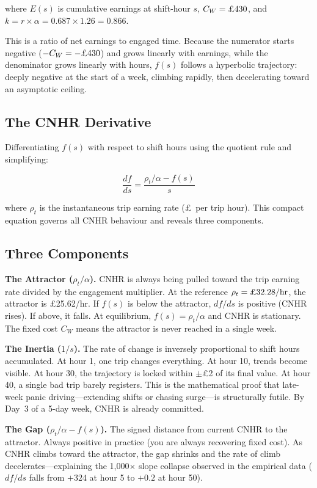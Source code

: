 \documentclass[a4paper,11pt]{article}
\begin{document}
where $E(s)$ is cumulative earnings at shift-hour $s$, $C_W = \text{\pounds430}$, and $k = r \times \alpha = 0.687 \times 1.26 = 0.866$.

This is a ratio of net earnings to engaged time. Because the numerator starts negative ($-C_W = -\text{\pounds430}$) and grows linearly with earnings, while the denominator grows linearly with hours, $f(s)$ follows a hyperbolic trajectory: deeply negative at the start of a week, climbing rapidly, then decelerating toward an asymptotic ceiling.

\subsection{The CNHR Derivative}

Differentiating $f(s)$ with respect to shift hours using the quotient rule and simplifying:

\begin{equation}
\boxed{\frac{df}{ds} = \frac{\rho_t / \alpha - f(s)}{s}}
\end{equation}

where $\rho_t$ is the instantaneous trip earning rate (\pounds\ per trip hour). This compact equation governs all CNHR behaviour and reveals three components.

\subsection{Three Components}

\textbf{The Attractor ($\rho_t / \alpha$).} CNHR is always being pulled toward the trip earning rate divided by the engagement multiplier. At the reference $\rho_t = \text{\pounds32.28/hr}$, the attractor is \pounds25.62/hr. If $f(s)$ is below the attractor, $df/ds$ is positive (CNHR rises). If above, it falls. At equilibrium, $f(s) = \rho_t / \alpha$ and CNHR is stationary. The fixed cost $C_W$ means the attractor is never reached in a single week.

\textbf{The Inertia ($1/s$).} The rate of change is inversely proportional to shift hours accumulated. At hour 1, one trip changes everything. At hour 10, trends become visible. At hour 30, the trajectory is locked within $\pm$\pounds2 of its final value. At hour 40, a single bad trip barely registers. This is the mathematical proof that late-week panic driving---extending shifts or chasing surge---is structurally futile. By Day~3 of a 5-day week, CNHR is already committed.

\textbf{The Gap ($\rho_t / \alpha - f(s)$).} The signed distance from current CNHR to the attractor. Always positive in practice (you are always recovering fixed cost). As CNHR climbs toward the attractor, the gap shrinks and the rate of climb decelerates---explaining the 1,000$\times$ slope collapse observed in the empirical data ($df/ds$ falls from $+324$ at hour 5 to $+0.2$ at hour 50).
\end{document}
